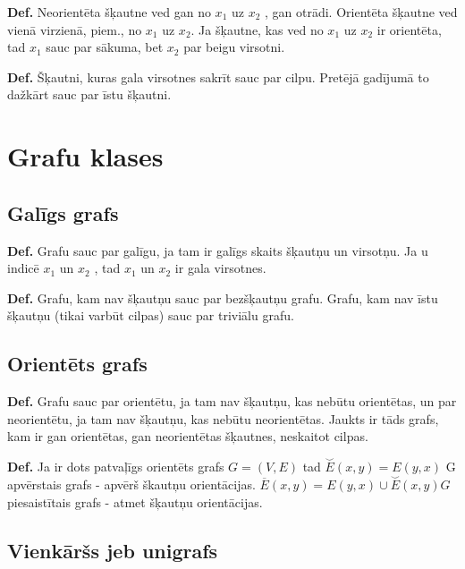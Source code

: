 \documentclass{article}
\begin{document}
\textbf{Def.} Neorientēta šķautne ved gan no $x_1$ uz $x_2$ , gan otrādi. Orientēta šķautne ved vienā virzienā, piem., no $x_1$ uz $x_2$. Ja šķautne, kas ved no $x_1$ uz $x_2$ ir orientēta, tad $x_1$ sauc par sākuma, bet $x_2$ par beigu virsotni. 

\textbf{Def.} Šķautni, kuras gala virsotnes sakrīt sauc par cilpu. Pretējā gadījumā to dažkārt sauc par īstu šķautni.

\section{Grafu klases}

\subsection{Galīgs grafs}

\textbf{Def.}  Grafu sauc par galīgu, ja tam ir galīgs skaits šķautņu un virsotņu. Ja u indicē $x_1$ un $x_2$ , tad $x_1$ un $x_2$ ir gala virsotnes.


\textbf{Def.} Grafu, kam nav šķautņu sauc par bezšķautņu grafu. Grafu, kam nav īstu šķautņu (tikai varbūt cilpas) sauc par triviālu grafu.

\subsection{Orientēts grafs}

\textbf{Def.} Grafu sauc par orientētu, ja tam nav šķautņu, kas nebūtu orientētas, un par neorientētu, ja tam nav šķautņu, kas nebūtu neorientētas.  Jaukts ir tāds grafs, kam ir gan orientētas, gan neorientētas šķautnes, neskaitot cilpas.

\textbf{Def.} Ja ir dots patvaļīgs orientēts grafs $G=(V,E)$ tad $\overset{\smallsmile}{E}(x, y ) = E (y , x )$ G apvērstais grafs - apvērš škautņu orientācijas. $\overline{E} (x, y ) = E (y , x)\cup \overset{\smallsmile}{E} (x, y ) G$ piesaistītais grafs - atmet šķautņu orientācijas. 


\subsection{Vienkāršs jeb unigrafs}
\end{document}
